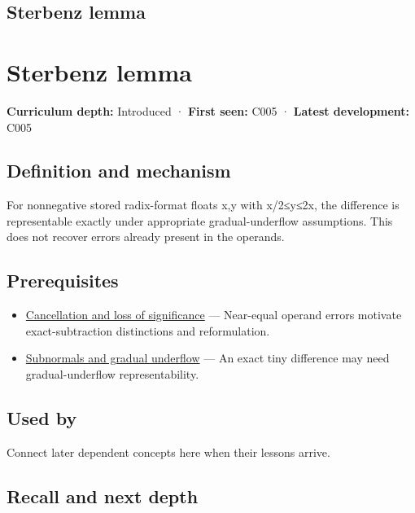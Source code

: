 \hypertarget{appendix-399b7ad53f39}{}
\section*{Sterbenz lemma}
\chapter{Sterbenz lemma}\label{appendix-399b7ad53f39-sterbenz-lemma}

\textbf{Curriculum depth:} Introduced · \textbf{First seen:} C005 · \textbf{Latest development:} C005

\section{Definition and mechanism}\label{appendix-399b7ad53f39-definition-and-mechanism}

For nonnegative stored radix-format floats x,y with x/2≤y≤2x, the difference is representable exactly under appropriate gradual-underflow assumptions. This does not recover errors already present in the operands.

\section{Prerequisites}\label{appendix-399b7ad53f39-prerequisites}

\begin{itemize}
\tightlist
\item
  \hyperref[appendix-a2773a6a2f9d]{Cancellation and loss of significance} --- Near-equal operand errors motivate exact-subtraction distinctions and reformulation.
\item
  \hyperref[appendix-00a6e044c437]{Subnormals and gradual underflow} --- An exact tiny difference may need gradual-underflow representability.
\end{itemize}

\section{Used by}\label{appendix-399b7ad53f39-used-by}

Connect later dependent concepts here when their lessons arrive.

\section{Recall and next depth}\label{appendix-399b7ad53f39-recall-and-next-depth}

